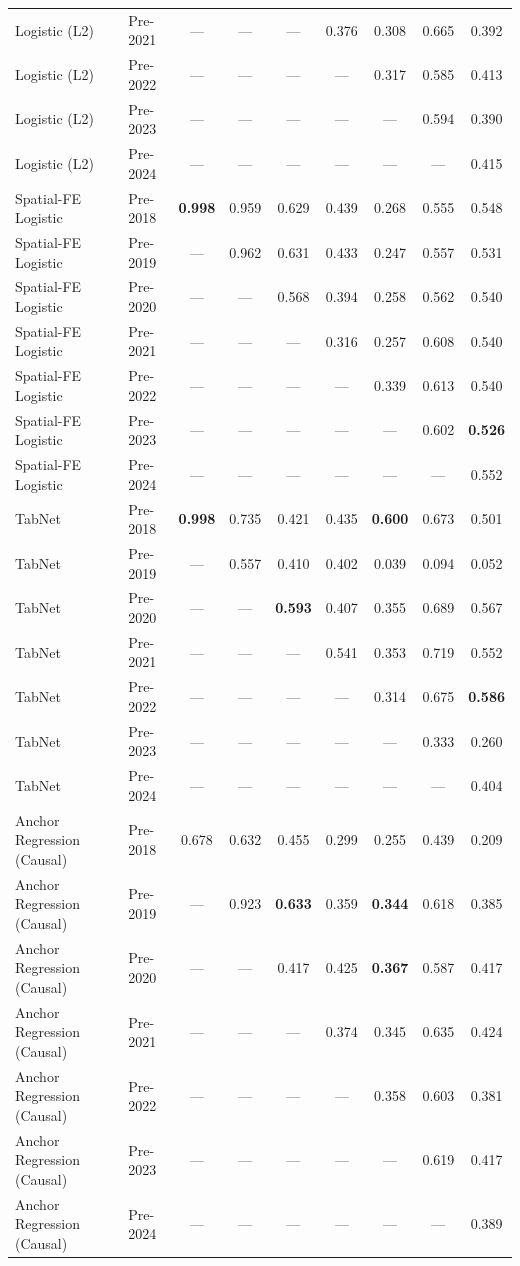 \begin{table}[htbp]
{\begin{tabular}{l lccccccc}
Logistic (L2) & Pre-2021 & --- & --- & --- & 0.376 & 0.308 & 0.665 & 0.392 \\
Logistic (L2) & Pre-2022 & --- & --- & --- & --- & 0.317 & 0.585 & 0.413 \\
Logistic (L2) & Pre-2023 & --- & --- & --- & --- & --- & 0.594 & 0.390 \\
Logistic (L2) & Pre-2024 & --- & --- & --- & --- & --- & --- & 0.415 \\
Spatial-FE Logistic & Pre-2018 & \textbf{0.998} & 0.959 & 0.629 & 0.439 & 0.268 & 0.555 & 0.548 \\
Spatial-FE Logistic & Pre-2019 & --- & 0.962 & 0.631 & 0.433 & 0.247 & 0.557 & 0.531 \\
Spatial-FE Logistic & Pre-2020 & --- & --- & 0.568 & 0.394 & 0.258 & 0.562 & 0.540 \\
Spatial-FE Logistic & Pre-2021 & --- & --- & --- & 0.316 & 0.257 & 0.608 & 0.540 \\
Spatial-FE Logistic & Pre-2022 & --- & --- & --- & --- & 0.339 & 0.613 & 0.540 \\
Spatial-FE Logistic & Pre-2023 & --- & --- & --- & --- & --- & 0.602 & \textbf{0.526} \\
Spatial-FE Logistic & Pre-2024 & --- & --- & --- & --- & --- & --- & 0.552 \\
TabNet & Pre-2018 & \textbf{0.998} & 0.735 & 0.421 & 0.435 & \textbf{0.600} & 0.673 & 0.501 \\
TabNet & Pre-2019 & --- & 0.557 & 0.410 & 0.402 & 0.039 & 0.094 & 0.052 \\
TabNet & Pre-2020 & --- & --- & \textbf{0.593} & 0.407 & 0.355 & 0.689 & 0.567 \\
TabNet & Pre-2021 & --- & --- & --- & 0.541 & 0.353 & 0.719 & 0.552 \\
TabNet & Pre-2022 & --- & --- & --- & --- & 0.314 & 0.675 & \textbf{0.586} \\
TabNet & Pre-2023 & --- & --- & --- & --- & --- & 0.333 & 0.260 \\
TabNet & Pre-2024 & --- & --- & --- & --- & --- & --- & 0.404 \\
Anchor Regression (Causal) & Pre-2018 & 0.678 & 0.632 & 0.455 & 0.299 & 0.255 & 0.439 & 0.209 \\
Anchor Regression (Causal) & Pre-2019 & --- & 0.923 & \textbf{0.633} & 0.359 & \textbf{0.344} & 0.618 & 0.385 \\
Anchor Regression (Causal) & Pre-2020 & --- & --- & 0.417 & 0.425 & \textbf{0.367} & 0.587 & 0.417 \\
Anchor Regression (Causal) & Pre-2021 & --- & --- & --- & 0.374 & 0.345 & 0.635 & 0.424 \\
Anchor Regression (Causal) & Pre-2022 & --- & --- & --- & --- & 0.358 & 0.603 & 0.381 \\
Anchor Regression (Causal) & Pre-2023 & --- & --- & --- & --- & --- & 0.619 & 0.417 \\
Anchor Regression (Causal) & Pre-2024 & --- & --- & --- & --- & --- & --- & 0.389 \\
\bottomrule
\end{tabular}%
}
\end{table}